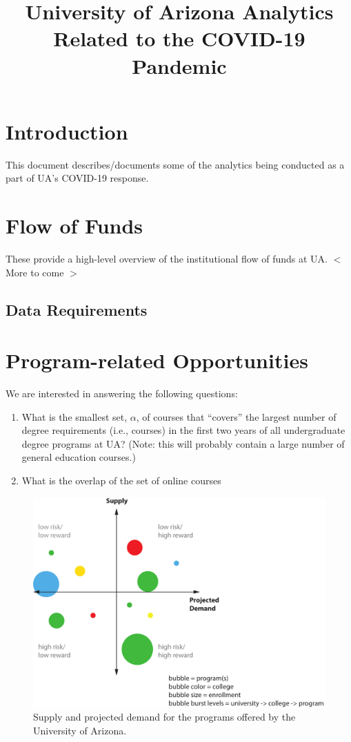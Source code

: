 \documentclass[12pt]{article}
\title{University of Arizona Analytics Related to the COVID-19 Pandemic}
\author{ }
\date{}
\theoremstyle{definition}%
\begin{document}
\maketitle
\section{Introduction}
This document describes/documents some of the analytics being conducted as a part of UA's COVID-19 response. 

\section{Flow of Funds}
These provide a high-level overview of the institutional flow of funds at UA.  $<$ More to come $>$

\subsection{Data Requirements}

\section{Program-related Opportunities}
We are interested in answering the following questions:
\begin{enumerate}
 \item What is the smallest set, $\alpha$, of courses that ``covers'' the largest number of degree requirements (i.e., courses) in the first two years of all undergraduate degree programs at UA?  (Note: this will probably contain a large number of general education courses.)
 \item What is the overlap of the set of online courses
\end{enumerate}

\begin{figure}
 \centerline{\includegraphics[width=4.75in]{./graphics/quad-bubble-supply-demand.pdf}}
 \caption{Supply and projected demand for the programs offered by the University of Arizona.}
\end{figure}
\end{document}

